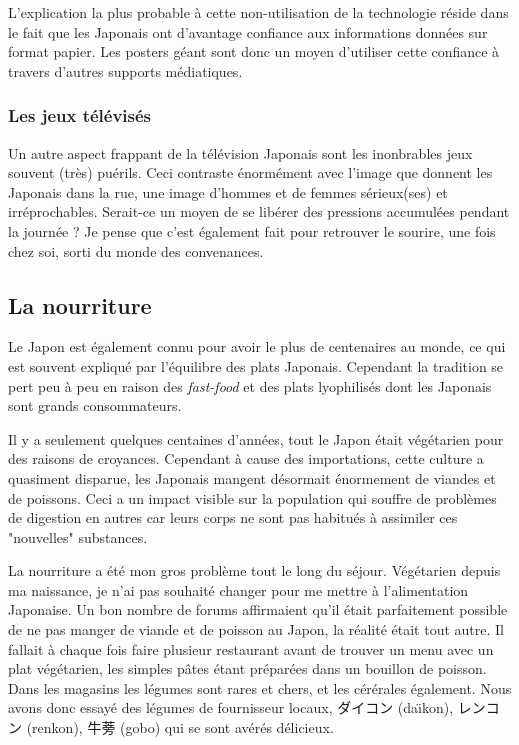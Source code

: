 \documentclass[journal]{RapportFR}
\begin{document}
\begin{CJK*}{UTF8}{min}
L'explication la plus probable \`a cette non-utilisation de la technologie r\'eside dans le fait que les Japonais ont d'avantage confiance aux informations donn\'ees sur format papier. Les posters g\'eant sont donc un moyen d'utiliser cette confiance \`a travers d'autres supports m\'ediatiques.  

\subsubsection{Les jeux t\'el\'evis\'es}

Un autre aspect frappant de la t\'el\'evision Japonais sont les inonbrables jeux souvent (tr\`es) pu\'erils. Ceci contraste \'enorm\'ement avec l'image que donnent les Japonais dans la rue, une image d'hommes et de femmes s\'erieux(ses) et irr\'eprochables. 
Serait-ce un moyen de se lib\'erer des pressions accumul\'ees pendant la journ\'ee ? Je pense que c'est \'egalement fait pour retrouver le sourire, une fois chez soi, sorti du monde des convenances. 

\subsection{La nourriture}

Le Japon est \'egalement connu pour avoir le plus de centenaires au monde, ce qui est souvent expliqu\'e par l'\'equilibre des plats Japonais. Cependant la tradition se pert peu \`a peu en raison des \textit{fast-food} et des plats lyophilis\'es dont les Japonais sont grands consommateurs.

Il y a seulement quelques centaines d'ann\'ees, tout le Japon \'etait v\'eg\'etarien pour des raisons de croyances. Cependant \`a cause des importations, cette culture a quasiment disparue, les Japonais mangent d\'esormait \'enormement de viandes et de poissons. Ceci a un impact visible sur la population qui souffre de probl\`emes de digestion en autres car leurs corps ne sont pas habitu\'es \`a assimiler ces "nouvelles" substances.

La nourriture a \'et\'e mon gros probl\`eme tout le long du s\'ejour. V\'eg\'etarien depuis ma naissance, je n'ai pas souhait\'e changer pour me mettre \`a l'alimentation Japonaise. Un bon nombre de forums affirmaient qu'il \'etait parfaitement possible de ne pas manger de viande et de poisson au Japon, la r\'ealit\'e \'etait tout autre. Il fallait \`a chaque fois faire plusieur restaurant avant de trouver un menu avec un plat v\'eg\'etarien, les simples p\^ates \'etant pr\'epar\'ees dans un bouillon de poisson.
Dans les magasins les l\'egumes sont rares et chers, et les c\'er\'erales \'egalement. Nous avons donc essay\'e des l\'egumes de fournisseur locaux, ダイコン (da\"\i kon),  レンコン  (renkon), 牛蒡 (gobo) qui se sont av\'er\'es d\'elicieux.


\end{CJK*}
\end{document}
